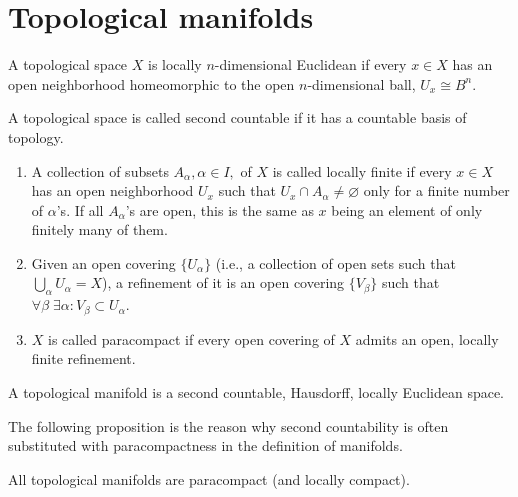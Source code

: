 \section{Topological manifolds}
\begin{defn}
    A topological space $X$ is locally $n$-dimensional Euclidean if every $x\in X$ has an open neighborhood homeomorphic to the open $n$-dimensional ball, $U_x\cong B^n$. 
\end{defn}
\begin{defn}
    A topological space is called second countable if it has a countable basis of topology.
\end{defn}
\begin{defn}[Paracompactness]
\begin{enumerate}
    \item A collection of subsets $A_\alpha, \alpha \in I,$ of $X$ is called locally finite if every $x\in X$ has an open neighborhood $U_x$ such that $U_x\cap A_\alpha \neq \varnothing$ only for a finite number of $\alpha$'s. If all $A_\alpha$'s are open, this is the same as $x$ being an element of only finitely many of them.
    \item Given an open covering $\{U_\alpha\}$ (i.e., a collection of open sets such that $\bigcup_\alpha U_\alpha=X$), a refinement of it is an open covering $\{V_\beta \}$ such that $\forall \beta \;\exists \alpha: V_\beta \subset U_\alpha $.
    \item $X$ is called paracompact if every open covering of $X$ admits an open, locally finite refinement.
\end{enumerate}
\end{defn}
\begin{defn}
    A topological manifold is a second countable, Hausdorff, locally Euclidean space.
\end{defn}
The following proposition is the reason why second countability is often substituted with paracompactness in the definition of manifolds.
\begin{prop}
    All topological manifolds are paracompact (and locally compact).
\end{prop}

